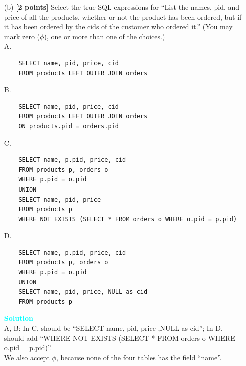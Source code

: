 \documentclass[10pt]{article}
\newenvironment{solution}
    { \begin{mdframed}[backgroundcolor=gray!10] \textcolor{cyan}{\textbf{Solution}} \\}
    {  \end{mdframed}}
\begin{document}
\begin{enumerate}
\begin{itemize}
		      \item[(b)] \textbf{[2 points]} Select the true SQL expressions for “List the names, pid, and price of all the products, whether or not the product has been ordered,
		            but if it has been ordered by the cids of the customer who ordered it.”
		            (You may mark zero ($\phi$), one or more than one of the choices.)\\
		            A. \begin{lstlisting}
	SELECT name, pid, price, cid
	FROM products LEFT OUTER JOIN orders
\end{lstlisting}
		            B. \begin{lstlisting}
	SELECT name, pid, price, cid 
	FROM products LEFT OUTER JOIN orders
	ON products.pid = orders.pid
\end{lstlisting}
		            C. \begin{lstlisting}
	SELECT name, p.pid, price, cid
	FROM products p, orders o
	WHERE p.pid = o.pid
	UNION
	SELECT name, pid, price
	FROM products p
	WHERE NOT EXISTS (SELECT * FROM orders o WHERE o.pid = p.pid)
\end{lstlisting}
		            D. \begin{lstlisting}
	SELECT name, p.pid, price, cid
	FROM products p, orders o
	WHERE p.pid = o.pid
	UNION
	SELECT name, pid, price, NULL as cid
	FROM products p
\end{lstlisting}
		            \begin{solution}
			            A, B: In C, should be ``SELECT name, pid, price ,NULL as cid'';
						In D, should add ``WHERE NOT EXISTS (SELECT * FROM orders o WHERE o.pid = p.pid)''. \\
						We also accept $\phi$, because none of the four tables has the field ``name''.
		            \end{solution}


\end{itemize}
\end{enumerate}
\end{document}
